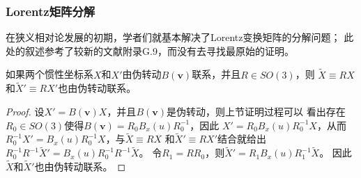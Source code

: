 \subsubsection{Lorentz矩阵分解}
在狭义相对论发展的初期，学者们就基本解决了Lorentz变换矩阵的分解问题；
此处的叙述参考了较新的文献\parencite{liang_zhou2009_2}附录G.9，而没有去寻找最原始的证明。




\begin{proposition}\label{chlg:thm_xx-txtx}
    如果两个惯性坐标系$X$和$X'$由伪转动$B(\boldsymbol{v})$联系，并且$R\in SO(3)$，则
    $\tilde{X}\equiv RX$和$\tilde{X}'\equiv RX'$也由伪转动联系。
\end{proposition}
\begin{proof}
    设$X'=B(\boldsymbol{v})X$，并且$B(\boldsymbol{v})$是伪转动，则上节证明过程可以
    看出存在$R_0\in SO(3)$使得$B(\boldsymbol{v})=R_0B_x(u)R_0^{-1}$，因此
    $X'=R_0B_x(u)R_0^{-1}X$，从而$R_0^{-1}X'=B_x(u)R_0^{-1}X$，与$\tilde{X}\equiv RX$
    和$\tilde{X}'\equiv RX'$结合就给出$R_0^{-1}R^{-1}\tilde{X}'=B_x(u)R_0^{-1}R^{-1}\tilde{X}$。
    令$R_1 = RR_0$，则$\tilde{X}'=R_{1}B_x(u)R_1^{-1}\tilde{X}$。
    因此$\tilde{X}$和$\tilde{X}'$也由伪转动联系。
\end{proof}

